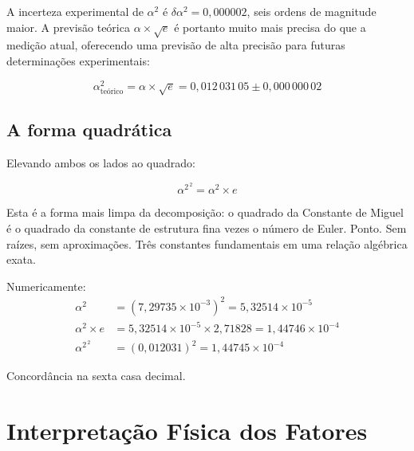 \documentclass[12pt,a4paper,twoside]{article}
\newcommand{\alphaii}{\alpha^{2}}
\begin{document}
A incerteza experimental de $\alphaii$ é $\delta\alphaii = 0{,}000002$, seis ordens de magnitude maior. A previsão teórica $\alpha \times \sqrt{e}$ é portanto muito mais precisa do que a medição atual, oferecendo uma previsão de alta precisão para futuras determinações experimentais:

\begin{equation}
\alphaii_{\text{teórico}} = \alpha \times \sqrt{e} = 0{,}012\,031\,05 \pm 0{,}000\,000\,02
\label{eq:previsao}
\end{equation}

\subsection{A forma quadrática}

Elevando ambos os lados ao quadrado:

\begin{equationbox}[title={Forma Quadrática}]
\begin{equation}
\boxed{\alphaii^{\,2} = \alpha^2 \times e}
\label{eq:quadratica}
\end{equation}
\end{equationbox}

\noindent Esta é a forma mais limpa da decomposição: o quadrado da Constante de Miguel é o quadrado da constante de estrutura fina vezes o número de Euler. Ponto. Sem raízes, sem aproximações. Três constantes fundamentais em uma relação algébrica exata.

Numericamente:
\begin{align}
\alpha^2 &= (7{,}29735 \times 10^{-3})^2 = 5{,}32514 \times 10^{-5} \\
\alpha^2 \times e &= 5{,}32514 \times 10^{-5} \times 2{,}71828 = 1{,}44746 \times 10^{-4} \\
\alphaii^{\,2} &= (0{,}012031)^2 = 1{,}44745 \times 10^{-4}
\end{align}

Concordância na sexta casa decimal.



\section{Interpretação Física dos Fatores}
\label{sec:fatores}
\end{document}
